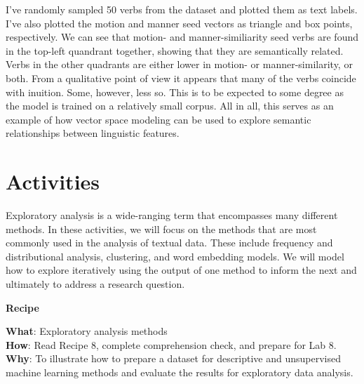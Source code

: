 \documentclass[
  letterpaper,
  krantz1]{latex/krantz-mod}
\theoremstyle{definition}
\theoremstyle{definition}
\theoremstyle{remark}
\begin{document}
I've randomly sampled 50 verbs from the dataset and plotted them as text
labels. I've also plotted the motion and manner seed vectors as triangle
and box points, respectively. We can see that motion- and
manner-similiarity seed verbs are found in the top-left quandrant
together, showing that they are semantically related. Verbs in the other
quadrants are either lower in motion- or manner-similarity, or both.
From a qualitative point of view it appears that many of the verbs
coincide with inuition. Some, however, less so. This is to be expected
to some degree as the model is trained on a relatively small corpus. All
in all, this serves as an example of how vector space modeling can be
used to explore semantic relationships between linguistic features.

\section*{Activities}\label{activities-6}


Exploratory analysis is a wide-ranging term that encompasses many
different methods. In these activities, we will focus on the methods
that are most commonly used in the analysis of textual data. These
include frequency and distributional analysis, clustering, and word
embedding models. We will model how to explore iteratively using the
output of one method to inform the next and ultimately to address a
research question.

\begin{tcolorbox}[enhanced jigsaw, leftrule=.75mm, colframe=quarto-callout-color-frame, left=2mm, colback=white, toprule=.15mm, breakable, arc=.35mm, opacityback=0, bottomrule=.15mm, rightrule=.15mm]

\textbf{ Recipe}

\textbf{What}: Exploratory analysis methods\\
\textbf{How}: Read Recipe 8, complete comprehension check, and prepare
for Lab 8.\\
\textbf{Why}: To illustrate how to prepare a dataset for descriptive and
unsupervised machine learning methods and evaluate the results for
exploratory data analysis.

\end{tcolorbox}
\end{document}
